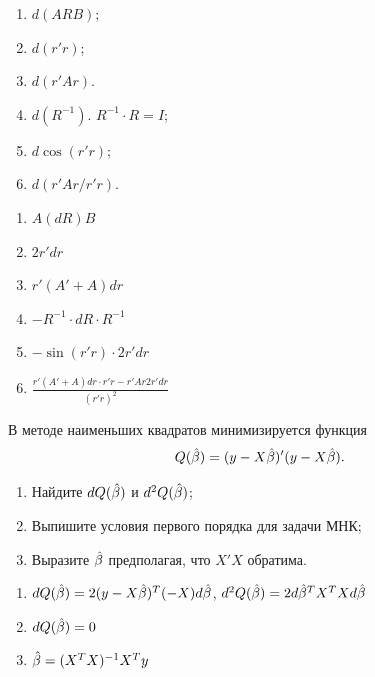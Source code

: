 \begin{problem}


\begin{enumerate}
\item {}  $d(ARB)$;
\item {}  $d(r'r)$;
\item {}  $d(r'Ar)$. 
\item {}  $d(R^{-1})$.  $R^{-1} \cdot R = I$;
\item {}  $d \cos(r'r)$;
\item {}  $d(r'Ar/r'r)$. 
\end{enumerate}



\begin{sol}
\begin{enumerate}
\item $A(dR)B$
\item $2r'dr$
\item $r'(A'+A)dr$
\item $-R^{-1}\cdot dR \cdot R^{-1}$
\item $-\sin(r'r)\cdot 2r'dr$
\item $\frac{r'(A'+A)dr \cdot r'r - r'Ar2r'dr}{(r'r)^2}$
\end{enumerate}
\end{sol}
\end{problem}


\begin{problem}
В методе наименьших квадратов минимизируется функция
\[
Q(\hat{\beta}) = (y - X\hat{\beta})'(y - X\hat{\beta}).
\]

\begin{enumerate}
\item Найдите $dQ(\hat{\beta})$ и $d^2Q(\hat{\beta})$;
\item Выпишите условия первого порядка для задачи МНК;
\item Выразите $\hat{\beta}$ предполагая, что $X'X$ обратима.
\end{enumerate}


\begin{sol}
\begin{enumerate}
\item $dQ(\hat{\beta}) = 2(y-X\hat{\beta})^T (-X) d\hat{\beta}$, $d^2Q(\hat{\beta}) = 2d\hat{\beta}^T X^T X d\hat{\beta}$
\item $dQ(\hat{\beta}) = 0$
\item $\hat{\beta} = (X^T X)^{-1} X^T y$
\end{enumerate}
\end{sol}
\end{problem}

